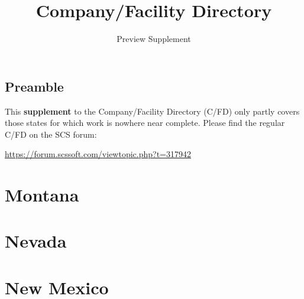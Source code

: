 
\subject{City location descriptions for ATS}
\title{Company\!/Facility Directory}
\subtitle{Preview Supplement}  %


\usepackage{scrlayer-scrpage}  %



\maketitle

\section*{Preamble}

{
\justifying

This \textbf{supplement} to the Company/Facility Directory (C/FD) only partly covers those states for which work is nowhere near complete.
Please find the regular C/FD on the SCS forum:

\centering \vspace{1ex}
\url{https://forum.scssoft.com/viewtopic.php?t=317942} \par
}

\maketoc


%

{%

\chapter{Montana}
}


\chapter{Nevada}


\chapter{New Mexico}


